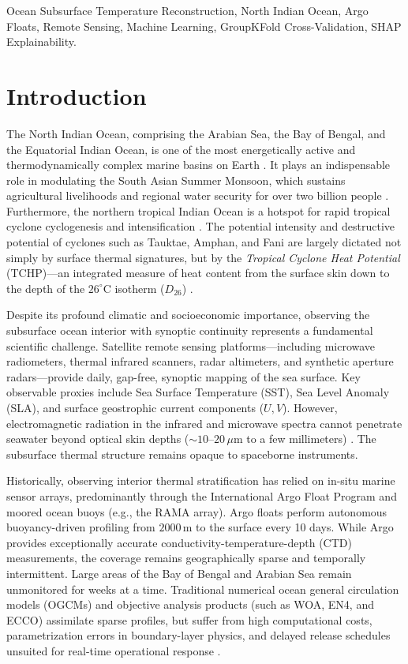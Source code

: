 \documentclass[conference]{IEEEtran}
\begin{document}
\begin{IEEEkeywords}
Ocean Subsurface Temperature Reconstruction, North Indian Ocean, Argo Floats, Remote Sensing, Machine Learning, GroupKFold Cross-Validation, SHAP Explainability.
\end{IEEEkeywords}

\section{Introduction}
The North Indian Ocean, comprising the Arabian Sea, the Bay of Bengal, and the Equatorial Indian Ocean, is one of the most energetically active and thermodynamically complex marine basins on Earth \cite{shenoi2002differences}. It plays an indispensable role in modulating the South Asian Summer Monsoon, which sustains agricultural livelihoods and regional water security for over two billion people \cite{gadgil2003monsoon}. Furthermore, the northern tropical Indian Ocean is a hotspot for rapid tropical cyclone cyclogenesis and intensification \cite{vinayachandran2021oceanic}. The potential intensity and destructive potential of cyclones such as Tauktae, Amphan, and Fani are largely dictated not simply by surface thermal signatures, but by the \textit{Tropical Cyclone Heat Potential} (TCHP)—an integrated measure of heat content from the surface skin down to the depth of the $26^\circ\text{C}$ isotherm ($D_{26}$) \cite{wada2014impact}.

Despite its profound climatic and socioeconomic importance, observing the subsurface ocean interior with synoptic continuity represents a fundamental scientific challenge. Satellite remote sensing platforms—including microwave radiometers, thermal infrared scanners, radar altimeters, and synthetic aperture radars—provide daily, gap-free, synoptic mapping of the sea surface. Key observable proxies include Sea Surface Temperature (SST), Sea Level Anomaly (SLA), and surface geostrophic current components ($U, V$). However, electromagnetic radiation in the infrared and microwave spectra cannot penetrate seawater beyond optical skin depths ($\sim 10\text{--}20\,\mu\text{m}$ to a few millimeters) \cite{donlon2002toward}. The subsurface thermal structure remains opaque to spaceborne instruments.

Historically, observing interior thermal stratification has relied on in-situ marine sensor arrays, predominantly through the International Argo Float Program \cite{roemmich2009argo} and moored ocean buoys (e.g., the RAMA array). Argo floats perform autonomous buoyancy-driven profiling from $2000\,\text{m}$ to the surface every 10 days. While Argo provides exceptionally accurate conductivity-temperature-depth (CTD) measurements, the coverage remains geographically sparse and temporally intermittent. Large areas of the Bay of Bengal and Arabian Sea remain unmonitored for weeks at a time. Traditional numerical ocean general circulation models (OGCMs) and objective analysis products (such as WOA, EN4, and ECCO) assimilate sparse profiles, but suffer from high computational costs, parametrization errors in boundary-layer physics, and delayed release schedules unsuited for real-time operational response \cite{fox2002bayesian}.
\end{document}
